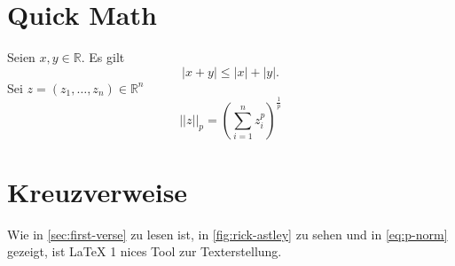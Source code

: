 \documentclass[a4]{article}
\begin{document}
\section{Quick Math}

Seien \(x,y \in \mathbb{R}\). Es gilt
\[ |x+y| \leq |x| + |y|. \]
Sei \(z = (z_1, \dots, z_n) \in \mathbb{R}^n\)
\begin{equation}
    ||z||_p = \left(\sum_{i=1}^n z_i^p\right)^{\frac{1}{p}} \label{eq:p-norm}
\end{equation}

\section{Kreuzverweise}

Wie in \autoref{sec:first-verse} zu lesen ist, in \autoref{fig:rick-astley} zu sehen und in \autoref{eq:p-norm} gezeigt, ist \LaTeX{} 1 nices Tool zur Texterstellung.
\end{document}
